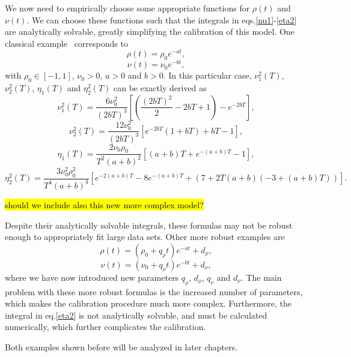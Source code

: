 We now need to empirically choose some appropriate functions for $\rho(t)$ and $\nu(t)$.
We can choose these functions such that the integrals in eqs.\eqref{nu1}-\eqref{eta2} are analytically  solvable, greatly simplifying the calibration of this model.
One classical example~\cite{Fernandez} corresponds to
\begin{equation}\label{rhot}
\rho(t)=\rho_0e^{-at},
\end{equation}
\begin{equation}\label{nut}
\nu(t)=\nu_0e^{-bt},
\end{equation}
\noindent with $\rho_0\in[-1,1]$, $\nu_0>0$, $a>0$ and $b>0$.
In this particular case, $\nu_1^2(T)$, $\nu_2^2(T)$, $\eta_1(T)$ and $\eta_2^2(T)$ can be exactly derived as
\begin{equation}
\nu_1^2(T)=\frac{6\nu_0^2}{(2bT)^3}\left[\left(\frac{(2bT)^2}{2}-2bT+1\right)-e^{-2bT}\right],
\end{equation}
\begin{equation}
\nu_2^2(T)=\frac{12\nu_0^2}{(2bT)^3}\left[e^{-2bT}(1+bT)+bT-1\right],
\end{equation}
\begin{equation}
\eta_1(T)=\frac{2\nu_0\rho_0}{T^2(a+b)^2}\left[(a+b)T+e^{-(a+b)T}-1\right],
\end{equation}
\begin{equation}
\eta_2^2(T)=\frac{3\nu_0^2\rho_0^2}{T^4(a+b)^4}\left[e^{-2(a+b)T}-8e^{-(a+b)T}+(7+2T(a+b)(-3+(a+b)T))\right].
\end{equation}

\hl{should we include also this new more complex model?}

Despite their analytically solvable integrals, these formulas may not be robust enough to appropriately fit large data sets. Other more robust examples are
\begin{equation}\label{rhot2}
\rho(t)=(\rho_0+q_\rho t)e^{-at}+d_\rho,
\end{equation}
\begin{equation}\label{nut2}
\nu(t)=(\nu_0+q_\nu t)e^{-bt}+d_\nu,
\end{equation}
\noindent where we have now introduced new parameters $q_\rho$, $d_\rho$, $q_\nu$ and $d_\nu$.
The main problem with these more robust formulas is the increased number of parameters, which makes the calibration procedure much more complex. Furthermore, the integral in eq.\eqref{eta2} is not analytically solvable, and must be calculated numerically, which further complicates the calibration.

Both examples shown before will be analyzed in later chapters. 
